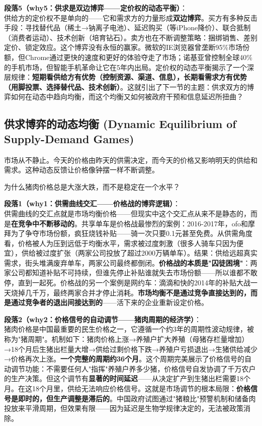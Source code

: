 \documentclass[../main.tex]{subfiles}
\begin{document}
	\textbf{段落5（why5：供求是双边博弈——定价权的动态平衡）}：\\
	供给方的定价权不是单向的——它和需求方的力量形成\textbf{双边博弈}。买方有多种反击手段：寻找替代品（稀土→钠离子电池）、延迟购买（等iPhone降价）、联合抵制（消费者运动）、技术创新（培育钻石）。卖方也在不断调整策略：捆绑销售、差别定价、锁定效应。这个博弈没有永恒的赢家。微软的IE浏览器曾垄断95\%市场份额，但Chrome通过更快的速度和更好的体验夺走了市场；诺基亚曾控制全球40\%的手机市场，但智能手机革命让它在5年内出局。定价权的动态平衡揭示了一个深层规律：\textbf{短期看供给方有优势（控制资源、渠道、信息），长期看需求方有优势（用脚投票、选择替代品、技术创新）}。这就引出了下一节的主题：供求双方的博弈如何在动态中趋向均衡，而这个均衡又如何被政府干预和信息延迟所扭曲？

	\subsection{供求博弈的动态均衡 (Dynamic Equilibrium of Supply-Demand Games)}
	\begin{motivation}
		市场从不静止。今天的价格由昨天的供需决定，而今天的价格又影响明天的供给和需求。这种动态反馈让价格像钟摆一样不断调整。
	\end{motivation}
	\begin{questionbox}
		为什么猪肉价格总是大涨大跌，而不是稳定在一个水平？
	\end{questionbox}

	\textbf{段落1（why1：供需曲线交汇——价格战的博弈逻辑）}：\\
	供需曲线的交汇点就是市场均衡价格——但现实中这个交汇点从来不是静态的，而是\textbf{在竞争中不断移动的}。共享单车是价格战最惨烈的案例：2016-2017年，ofo和摩拜为了争夺市场份额，疯狂烧钱补贴——骑一次只要0.1元甚至免费。从供需角度看，价格被人为压到远低于均衡水平，需求被过度刺激（很多人骑车只因为便宜），供给被过度扩张（两家公司投放了超过2000万辆单车）。结果：供给远超真实需求，街头堆满废弃单车，两家公司最终都倒闭。\textbf{价格战的本质是"囚徒困境"}：两家公司都知道补贴不可持续，但谁先停止补贴谁就失去市场份额——所以谁都不敢停，直到一起死。价格战的另一个案例是网约车：滴滴和快的2014年的补贴大战一天烧掉几千万，最终两家合并才停止消耗。\textbf{市场均衡不是通过竞争直接达到的，而是通过竞争者的退出间接达到的}——活下来的企业重新设定价格。

	\textbf{段落2（why2：价格信号的自动调节——猪肉周期的经济学）}：\\
	猪肉价格是中国最重要的民生价格之一，它遵循一个约3年的周期性波动规律，被称为"猪周期"。机制如下：猪肉价格上涨→养殖户扩大养殖（母猪存栏量增加）→18个月后生猪出栏量大增→供给过剩价格下跌→养殖户亏损退出→生猪供给减少→价格再次上涨。\textbf{一个完整的周期约36个月}。这个周期完美展示了价格信号的自动调节功能：不需要任何人"指挥"养殖户养多少猪，价格信号自发协调了千万农户的生产决策。但这个调节有\textbf{显著的时间延迟}——从决定扩产到生猪出栏需要18个月。在这18个月里，供给无法响应价格信号。这就是市场调节的根本局限：\textbf{价格信号是即时的，但生产调整是滞后的}。中国政府试图通过"猪粮比"预警机制和储备肉投放来平滑周期，但效果有限——因为延迟是生物学规律决定的，无法被政策消除。
\end{document}
